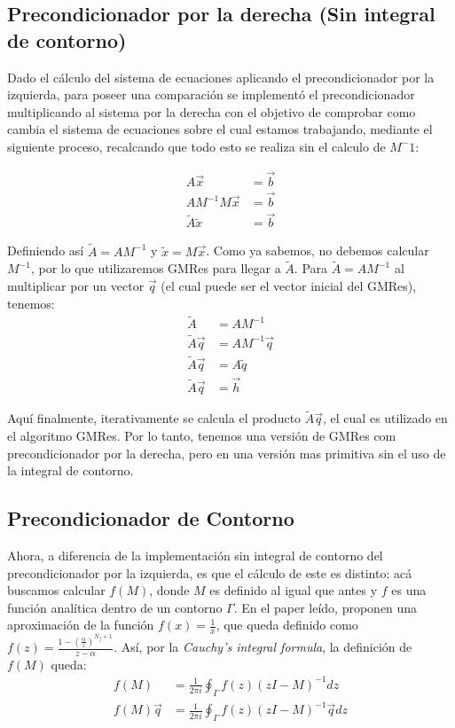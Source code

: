 \documentclass[fleqn]{article}
\begin{document}
\subsection{Precondicionador por la derecha (Sin integral de contorno)}

Dado el cálculo del sistema de ecuaciones aplicando el precondicionador por la izquierda, para poseer una comparación se implementó el precondicionador multiplicando al sistema por la derecha con el objetivo de comprobar como cambia el sistema de ecuaciones sobre el cual estamos trabajando, mediante el siguiente proceso, recalcando que todo esto se realiza sin el calculo de $M^-1$:

\begin{align*}
    A\vec{x} &= \vec{b} \\
    A M^{-1} M\vec{x} &= \vec{b} \\
    \widetilde{A}\widetilde{x} &= \vec{b}
\end{align*}

Definiendo así $\widetilde{A} = AM^{-1}$ y $\widetilde{x} = M\vec{x}$. Como ya sabemos, no debemos calcular $M^{-1}$, por lo que utilizaremos GMRes para llegar a $\widetilde{A}$. Para $\widetilde{A} = AM^{-1}$ al multiplicar por un vector $\vec{q}$ (el cual puede ser el vector inicial del GMRes), tenemos:
\begin{align*}
    \widetilde{A} &= AM^{-1} \\
    \widetilde{A}\vec{q} &= AM^{-1}\vec{q}\\
    \widetilde{A}\vec{q} &= A\widetilde{q}\\
    \widetilde{A}\vec{q} &= \vec{h}
\end{align*}

Aquí finalmente, iterativamente se calcula el producto $\widetilde{A}\vec{q}$, el cual es utilizado en el algoritmo GMRes. Por lo tanto, tenemos una versión de GMRes com precondicionador por la derecha, pero en una versión mas primitiva sin el uso de la integral de contorno.
 

\subsection{Precondicionador de Contorno}

Ahora, a diferencia de la implementación sin integral de contorno del precondicionador por la izquierda, es que el cálculo de este es distinto: acá buscamos calcular $f(M)$, donde $M$ es definido al igual que antes y $f$ es una función analítica dentro de un contorno $\Gamma$. En el paper leído, proponen una aproximación de la función $f(x) = \displaystyle{\frac{1}{x}}$, que queda definido como $f(z) = \displaystyle{\frac{1 - (\frac{\alpha}{z})^{N_f + 1}}{z - \alpha}}$. Así, por la \textit{Cauchy's integral formula}, la definición de $f(M)$ queda:
\begin{align*}
    f(M) &= \frac{1}{2\pi i} \oint_{\Gamma} f(z)(zI - M)^{-1}dz \\
    f(M)\vec{q} &= \frac{1}{2\pi i} \oint_{\Gamma} f(z)(zI - M)^{-1}\vec{q}dz
\end{align*}
\end{document}
